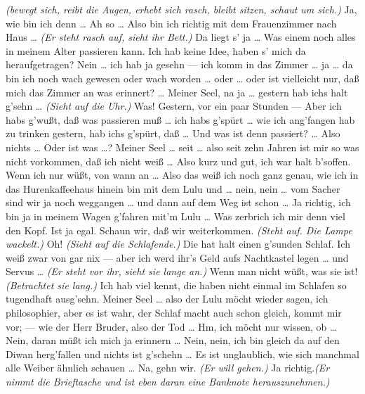 \documentclass[
	final,
	a4paper,
	ngerman,
	mpinclude = true, %
	twoside = true,
	open = right,
	cleardoublepage = plain,
	DIV = 13,
	BCOR = 1cm,
	titlepage = firstiscover,
	]{scrbook}
\newcommand{\direction}[1]{\textit{(#1)}}
\newcommand{\thecharacter}[1]{\textup{\textsc{#1}}\xspace}
\newcommand{\thegraf}{\thecharacter{Graf}}
\newcommand{\character}[1]{\item[#1:]}
\newcommand{\graf}{\character{\thegraf}}
\begin{document}
\begin{play}
	\graf
	\direction{bewegt sich, reibt die Augen, erhebt sich rasch, bleibt sitzen, schaut um sich.} Ja, wie bin ich denn \ldots{} Ah so \ldots{} Also bin ich richtig mit dem Frauenzimmer nach Haus \ldots{} \direction{Er steht rasch auf, sieht ihr Bett.} Da liegt s' ja \ldots{} Was einem noch alles in meinem Alter passieren kann. Ich hab keine Idee, haben s' mich da heraufgetragen? Nein \ldots{} ich hab ja gesehn --- ich komm in das Zimmer \ldots{} ja \ldots{} da bin ich noch wach gewesen oder wach worden \ldots{} oder \ldots{} oder ist vielleicht nur, daß mich das Zimmer an was erinnert? \ldots{} Meiner Seel, na ja \ldots{} gestern hab ichs halt g'sehn \ldots{} \direction{Sieht auf die Uhr.} Was! Gestern, vor ein paar Stunden --- Aber ich habs g'wußt, daß was passieren muß \ldots{} ich habs g'spürt \ldots{} wie ich ang'fangen hab zu trinken gestern, hab ichs g'spürt, daß \ldots{} Und was ist denn passiert? \ldots{} Also nichts \ldots{} Oder ist was \ldots{}? Meiner Seel \ldots{} seit \ldots{} also seit zehn Jahren ist mir so was nicht vorkommen, daß ich nicht weiß \ldots{} Also kurz und gut, ich war halt b'soffen. Wenn ich nur wüßt, von wann an \ldots{} Also das weiß ich noch ganz genau, wie ich in das Hurenkaffeehaus hinein bin mit dem Lulu und \ldots{} nein, nein \ldots{} vom Sacher sind wir ja noch weggangen \ldots{} und dann auf dem Weg ist schon \ldots{} Ja richtig, ich bin ja in meinem Wagen g'fahren mit'm Lulu \ldots{} Was zerbrich ich mir denn viel den Kopf. Ist ja egal. Schaun wir, daß wir weiterkommen. \direction{Steht auf. Die Lampe wackelt.} Oh! \direction{Sieht auf die Schlafende.} Die hat halt einen g'sunden Schlaf. Ich weiß zwar von gar nix --- aber ich werd ihr's Geld aufs Nachtkastel legen \ldots{} und Servus \ldots{} \direction{Er steht vor ihr, sieht sie lange an.} Wenn man nicht wüßt, was sie ist! \direction{Betrachtet sie lang.} Ich hab viel kennt, die haben nicht einmal im Schlafen so tugendhaft ausg'sehn. Meiner Seel \ldots{} also der Lulu möcht wieder sagen, ich philosophier, aber es ist wahr, der Schlaf macht auch schon gleich, kommt mir vor; --- wie der Herr Bruder, also der Tod \ldots{} Hm, ich möcht nur wissen, ob \ldots{} Nein, daran müßt ich mich ja erinnern \ldots{} Nein, nein, ich bin gleich da auf den Diwan herg'fallen und nichts ist g'schehn \ldots{} Es ist unglaublich, wie sich manchmal alle Weiber ähnlich schauen \ldots{} Na, gehn wir. \direction{Er will gehen.} Ja richtig.\direction{Er nimmt die Brieftasche und ist eben daran eine Banknote herauszunehmen.}


\end{play}
\end{document}
